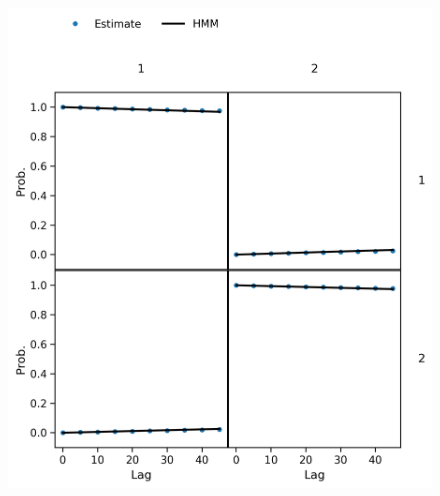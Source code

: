 \begin{figure}
    \centering
    \includegraphics{chapters/hmm_selection/figures/ck_test_5_2.png}
    
    \label{fig:prinz_ck_test_5_2}
\end{figure}


